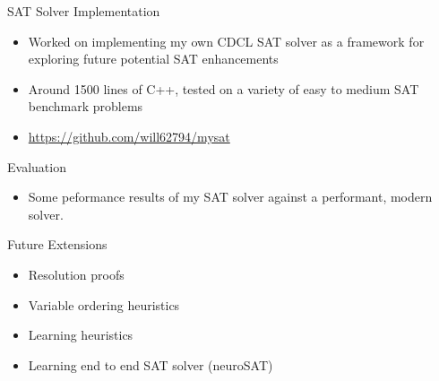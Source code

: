 \documentclass{beamer}
\begin{document}
\begin{frame}{SAT Solver Implementation}
    \begin{itemize}
        \item Worked on implementing my own CDCL SAT solver as a framework for exploring future potential SAT enhancements
        \item Around 1500 lines of C++, tested on a variety of easy to medium SAT benchmark problems
        \item \url{https://github.com/will62794/mysat}
    \end{itemize}
\end{frame}

\begin{frame}{Evaluation}
    \begin{itemize}
        \item Some peformance results of my SAT solver against a performant, modern solver.
    \end{itemize}
\end{frame}

\begin{frame}{Future Extensions}
    \begin{itemize}
        \item Resolution proofs
        \item Variable ordering heuristics
        \item Learning heuristics
        \item Learning end to end SAT solver (neuroSAT)
    \end{itemize}
\end{frame}



\end{document}
